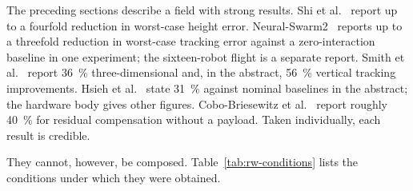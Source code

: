 The preceding sections describe a field with strong results. Shi et al.~\cite{shi2020neuralswarm}
report up to a fourfold reduction in worst-case height error. Neural-Swarm2~\cite{shi2022neuralswarm2}
reports up to a threefold reduction in worst-case tracking error against a zero-interaction
baseline in one experiment; the sixteen-robot flight is a separate report.
Smith et al.~\cite{smith2023so2equivariant} report \SI{36}{\percent} three-dimensional and, in the
abstract, \SI{56}{\percent} vertical tracking improvements. Hsieh et al.~\cite{hsieh2026flatness} state
\SI{31}{\percent} against nominal baselines in the abstract; the hardware body gives other figures.
Cobo-Briesewitz et al.~\cite{cobobriesewitz2026lindi} report roughly \SI{40}{\percent} for
residual compensation without a payload. Taken individually, each result is credible.

They cannot, however, be composed. Table~\ref{tab:rw-conditions} lists the conditions under which
they were obtained.

